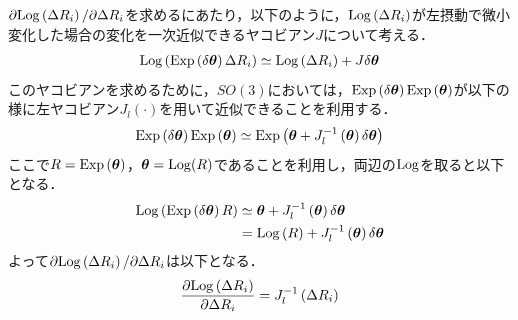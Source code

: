 $\partial {\rm Log} \left( \Delta R_{i} \right) / \partial \Delta R_{i}$を求めるにあたり，以下のように，${\rm Log} \left( \Delta R_{i} \right)$が左摂動で微小変化した場合の変化を一次近似できるヤコビアン$J$について考える．
%
\begin{align}
  {\rm Log} \left( {\rm Exp} \left( \delta \boldsymbol \theta \right) \Delta R_{i} \right)
  \simeq
  {\rm Log} \left( \Delta R_{i} \right) + J \delta  \boldsymbol \theta %
\end{align}
%
このヤコビアンを求めるために，$SO(3)$においては，${\rm Exp} \left( \delta \boldsymbol \theta \right) {\rm Exp} \left( \boldsymbol \theta \right)$が以下の様に左ヤコビアン$J_{l} \left( \cdot \right)$を用いて近似できることを利用する．
%
\begin{align}
  {\rm Exp} \left( \delta \boldsymbol \theta \right) {\rm Exp} \left( \boldsymbol \theta \right)
  \simeq
  {\rm Exp} \left( \boldsymbol \theta + J_{l}^{-1} \left( \boldsymbol \theta \right) \delta \boldsymbol \theta \right)
\end{align}
%
ここで$R = {\rm Exp} \left( \boldsymbol \theta \right)$，$\boldsymbol \theta = {\rm Log} (R)$であることを利用し，両辺の${\rm Log}$を取ると以下となる．
%
\begin{align}
  \begin{split}
    {\rm Log} \left( {\rm Exp} \left( \delta \boldsymbol \theta \right) R \right)
    & \simeq
    \boldsymbol \theta + J_{l}^{-1} \left( \boldsymbol \theta \right) \delta \boldsymbol \theta \\
    & =
    {\rm Log} \left( R \right) + J_{l}^{-1} \left( \boldsymbol \theta \right) \delta \boldsymbol \theta \\
  \end{split}
\end{align}
%
よって$\partial {\rm Log} \left( \Delta R_{i} \right) / \partial \Delta R_{i}$は以下となる．
%
\begin{align}
  \frac{ \partial {\rm Log} \left( \Delta R_{i} \right) }{ \partial \Delta R_{i} }
  =
  J_{l}^{-1} \left( \Delta R_{i} \right)
\end{align}

